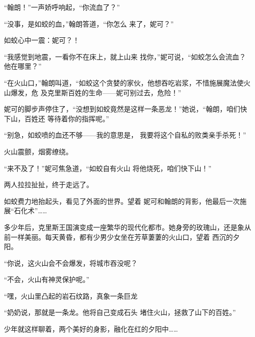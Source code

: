 \documentclass{article}
\begin{document}
“翰朗！”一声娇呼响起，“你流血了？” 

“没事，是如蛟的血，”翰朗答道，“你怎么
来了，妮可？” 


如蛟心中一震：妮可？！ 

“我感觉到地震，一看你不在床上，就上山来
\newpage
找你，”妮可说，“如蛟怎么会流血？他在哪里？”

“在火山口，”翰朗叫道，“如蛟这个贪婪的家伙，他想吞吃岩浆，不惜施展魔法使火山爆发，危
及克里斯百姓的生命——妮可别过去，危险！” 

妮可的脚步声停住了，“没想到如蛟竟然是这样一条恶龙！”她说，“翰朗，咱们快下山，百姓还
等待着你的指挥呢。” 

“别急，如蛟喷的血还不够——我的意思是，
我要将这个自私的败类亲手杀死！” 


火山震颤，烟雾缭绕。 

“来不及了！”妮可焦急道，“如蛟自有火山
将他烧死，咱们快下山！” 


两人拉拉扯扯，终于走远了。 

如蛟费力地抬起头，看见了外面的世界。望着
\newpage
妮可和翰朗的背影，他最后一次施展“石化术”……

多少年后，克里斯王国演变成一座繁华的现代化都市。她身旁的玫瑰山，还是象从前一样美丽。每天黄昏，都有少男少女坐在芳草萋萋的火山口，望着
西沉的夕阳。 

“你说，这火山会不会爆发，将城市吞没呢？


“不会，火山有神灵保护呢。” 

“嘿，火山里凸起的岩石纹路，真象一条巨龙

“奶奶说，那就是一条龙。他将自己变成石头
堵住火山，拯救了山下的百姓。” 

少年就这样聊着，两个美好的身影，融化在红的夕阳中……
\end{document}
